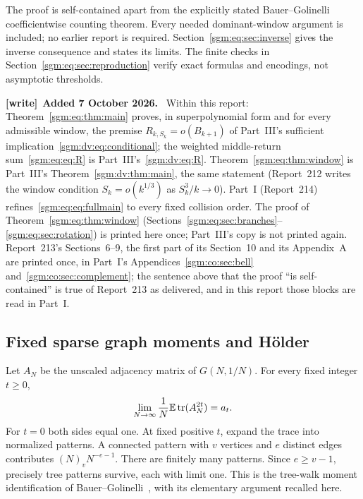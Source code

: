\documentclass[11pt,letterpaper]{article}
\theoremstyle{remark}\newtheorem{remark}[theorem]{Remark}
\newenvironment{writenote}[1][]{\par\smallskip\begingroup\small
 \noindent\textbf{[write]}\if\relax\detokenize{#1}\relax\else~\textbf{#1.}\fi\ }%
 {\par\endgroup\smallskip}
\theoremstyle{definition}\newtheorem{definition}[theorem]{Definition}
\begin{document}
The proof is self-contained apart from the explicitly stated Bauer--Golinelli coefficientwise counting theorem. Every needed dominant-window argument is included; no earlier report is required. Section~\ref{sgm:eq:sec:inverse} gives the inverse consequence and states its limits. The finite checks in Section~\ref{sgm:eq:sec:reproduction} verify exact formulas and encodings, not asymptotic thresholds.
\begin{writenote}[Added 7 October 2026]
Within this report: Theorem~\ref{sgm:eq:thm:main} proves, in superpolynomial form and for every admissible window, the premise $R_{k,S_k}=o(B_{k+1})$ of Part~III's sufficient implication~\eqref{sgm:dv:eq:conditional}; the weighted middle-return sum~\eqref{sgm:eq:eq:R} is Part~III's~\eqref{sgm:dv:eq:R}. Theorem~\ref{sgm:eq:thm:window} is Part~III's Theorem~\ref{sgm:dv:thm:main}, the same statement (Report~212 writes the window condition $S_k=o(k^{1/3})$ as $S_k^3/k\to0$). Part~I (Report~214) refines~\eqref{sgm:eq:eq:fullmain} to every fixed collision order. The proof of Theorem~\ref{sgm:eq:thm:window} (Sections~\ref{sgm:eq:sec:branches}--\ref{sgm:eq:sec:rotation}) is printed here once; Part~III's copy is not printed again. Report~213's Sections~6--9, the first part of its Section~10 and its Appendix~A are printed once, in Part~I's Appendices~\ref{sgm:co:sec:bell} and~\ref{sgm:co:sec:complement}; the sentence above that the proof ``is self-contained'' is true of Report~213 as delivered, and in this report those blocks are read in Part~I.
\end{writenote}

\subsection{Fixed sparse graph moments and H\"older}
Let $A_N$ be the unscaled adjacency matrix of $G(N,1/N)$. For every fixed integer $t\ge0$,
\begin{equation}\label{sgm:eq:eq:momentbridge}
 \lim_{N\to\infty}\frac1N\mathbb E\operatorname{tr}(A_N^{2t})=a_t.
\end{equation}
For $t=0$ both sides equal one. At fixed positive $t$, expand the trace into normalized patterns. A connected pattern with $v$ vertices and $e$ distinct edges contributes $(N)_vN^{-e-1}$. There are finitely many patterns. Since $e\ge v-1$, precisely tree patterns survive, each with limit one. This is the tree-walk moment identification of Bauer--Golinelli~\cite[Section 5.3]{bg}, with its elementary argument recalled here.
\end{document}
